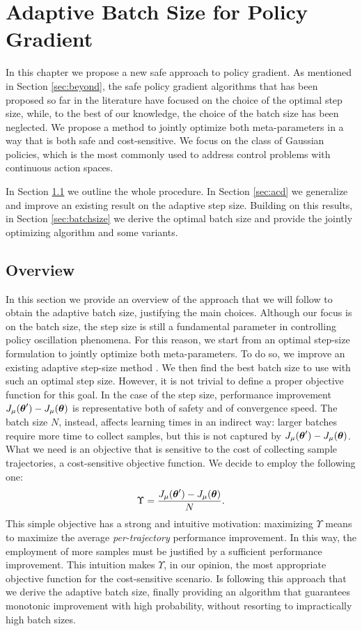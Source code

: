 \chapter{Adaptive Batch Size for Policy Gradient}\label{chap:main}
In this chapter we propose a new safe approach to policy gradient. As mentioned in Section \ref{sec:beyond}, the safe policy gradient algorithms that has been proposed so far in the literature have focused on the choice of the optimal step size, while, to the best of our knowledge, the choice of the batch size has been neglected. We propose a method to jointly optimize both meta-parameters in a way that is both safe and cost-sensitive. We focus on the class of Gaussian policies, which is the most commonly used to address control problems with continuous action spaces.

In Section \ref{sec:main_overview} we outline the whole procedure. In Section \ref{sec:acd} we generalize and improve an existing result on the adaptive step size. Building on this results, in Section \ref{sec:batchsize} we derive the optimal batch size and provide the jointly optimizing algorithm and some variants.


\section{Overview}\label{sec:main_overview}
In this section we provide an overview of the approach that we will follow to obtain the adaptive batch size, justifying the main choices.
Although our focus is on the batch size, the step size is still a fundamental parameter in controlling policy oscillation phenomena. For this reason, we start from an optimal step-size formulation to jointly optimize both meta-parameters. To do so, we improve an existing adaptive step-size method \cite{NIPS2013_5186}. We then find the best batch size to use with such an optimal step size.
However, it is not trivial to define a proper objective function for this goal. In the case of the step size, performance improvement $J_{\mu}(\boldsymbol{\theta}') - J_{\mu}(\boldsymbol{\theta})$ is representative both of safety and of convergence speed. The batch size $N$, instead, affects learning times in an indirect way: larger batches require more time to collect samples, but this is not captured by $J_{\mu}(\boldsymbol{\theta}') - J_{\mu}(\boldsymbol{\theta})$. What we need is an objective that is sensitive to the cost of collecting sample trajectories, \ie a cost-sensitive objective function. We decide to employ the following one:
\[
	\Upsilon = \frac{J_{\mu}(\boldsymbol{\theta}') - J_{\mu}(\boldsymbol{\theta})}{N}.
\]
This simple objective has a strong and intuitive motivation: maximizing $\Upsilon$ means to maximize the average \textit{per-trajectory} performance improvement. In this way, the employment of more samples must be justified by a sufficient performance improvement. This intuition makes $\Upsilon$, in our opinion, the most appropriate objective function for the cost-sensitive scenario.
Is following this approach that we derive the adaptive batch size, finally providing an algorithm that guarantees monotonic improvement with high probability, without resorting to impractically high batch sizes.



